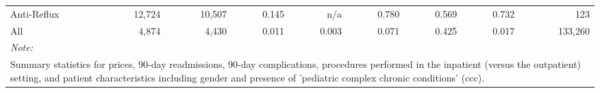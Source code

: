 \begin{table}[H]
\begin{tabular}{lrrrrrrrr}
\hspace{1em}Anti-Reflux & 12,724 & 10,507 & 0.145 & n/a & 0.780 & 0.569 & 0.732 & 123\\
\hspace{1em}All & 4,874 & 4,430 & 0.011 & 0.003 & 0.071 & 0.425 & 0.017 & 133,260\\
\bottomrule
\multicolumn{9}{l}{\rule{0pt}{1em}\textit{Note: }}\\
\multicolumn{9}{l}{\rule{0pt}{1em}Summary statistics for prices, 90-day readmissions, 90-day complications, procedures performed in the inpatient (versus the outpatient) setting, and patient characteristics including gender and presence of 'pediatric complex chronic conditions' (ccc).}\\
\end{tabular}
\end{table}

